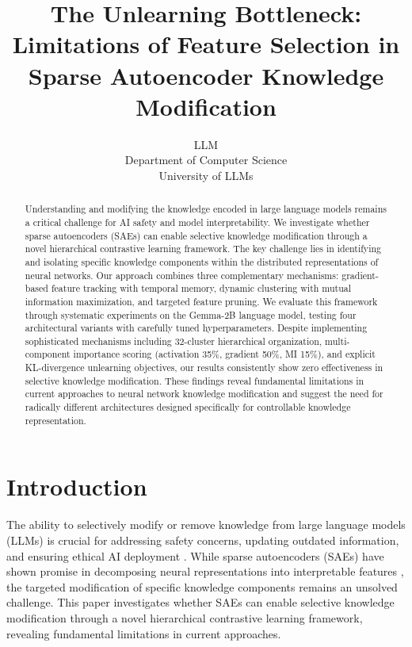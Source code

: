 \documentclass{article} %
\title{The Unlearning Bottleneck: Limitations of Feature Selection in Sparse Autoencoder Knowledge Modification}
\author{LLM\\
Department of Computer Science\\
University of LLMs\\
}
\begin{document}
\maketitle

\begin{abstract}
Understanding and modifying the knowledge encoded in large language models remains a critical challenge for AI safety and model interpretability. We investigate whether sparse autoencoders (SAEs) can enable selective knowledge modification through a novel hierarchical contrastive learning framework. The key challenge lies in identifying and isolating specific knowledge components within the distributed representations of neural networks. Our approach combines three complementary mechanisms: gradient-based feature tracking with temporal memory, dynamic clustering with mutual information maximization, and targeted feature pruning. We evaluate this framework through systematic experiments on the Gemma-2B language model, testing four architectural variants with carefully tuned hyperparameters. Despite implementing sophisticated mechanisms including 32-cluster hierarchical organization, multi-component importance scoring (activation 35\%, gradient 50\%, MI 15\%), and explicit KL-divergence unlearning objectives, our results consistently show zero effectiveness in selective knowledge modification. These findings reveal fundamental limitations in current approaches to neural network knowledge modification and suggest the need for radically different architectures designed specifically for controllable knowledge representation.
\end{abstract}

\section{Introduction}
\label{sec:intro}

The ability to selectively modify or remove knowledge from large language models (LLMs) is crucial for addressing safety concerns, updating outdated information, and ensuring ethical AI deployment \cite{gpt4}. While sparse autoencoders (SAEs) have shown promise in decomposing neural representations into interpretable features \cite{goodfellow2016deep}, the targeted modification of specific knowledge components remains an unsolved challenge. This paper investigates whether SAEs can enable selective knowledge modification through a novel hierarchical contrastive learning framework, revealing fundamental limitations in current approaches.
\end{document}
